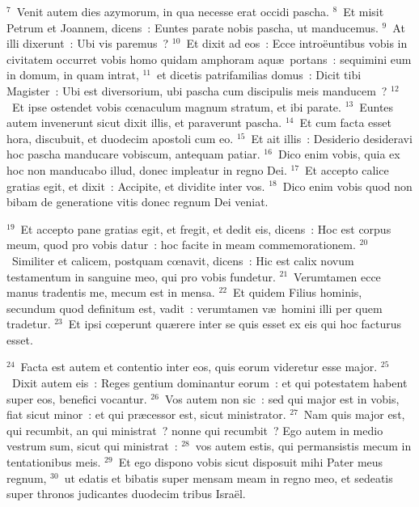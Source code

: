 ${}^{7}$~Venit autem dies azymorum, in qua necesse erat occidi pascha.
${}^{8}$~Et misit Petrum et Joannem, dicens~: Euntes parate nobis pascha, ut manducemus.
${}^{9}$~At illi dixerunt~: Ubi vis paremus~?
${}^{10}$~Et dixit ad eos~: Ecce intro\"euntibus vobis in civitatem occurret vobis homo quidam amphoram aqu\ae\ portans~: sequimini eum in domum, in quam intrat,
${}^{11}$~et dicetis patrifamilias domus~: Dicit tibi Magister~: Ubi est diversorium, ubi pascha cum discipulis meis manducem~?
${}^{12}$~Et ipse ostendet vobis cœnaculum magnum stratum, et ibi parate.
${}^{13}$~Euntes autem invenerunt sicut dixit illis, et paraverunt pascha.
${}^{14}$~Et cum facta esset hora, discubuit, et duodecim apostoli cum eo.
${}^{15}$~Et ait illis~: Desiderio desideravi hoc pascha manducare vobiscum, antequam patiar.
${}^{16}$~Dico enim vobis, quia ex hoc non manducabo illud, donec impleatur in regno Dei.
${}^{17}$~Et accepto calice gratias egit, et dixit~: Accipite, et dividite inter vos.
${}^{18}$~Dico enim vobis quod non bibam de generatione vitis donec regnum Dei veniat.


${}^{19}$~Et accepto pane gratias egit, et fregit, et dedit eis, dicens~: Hoc est corpus meum, quod pro vobis datur~: hoc facite in meam commemorationem.
${}^{20}$~Similiter et calicem, postquam cœnavit, dicens~: Hic est calix novum testamentum in sanguine meo, qui pro vobis fundetur.
${}^{21}$~Verumtamen ecce manus tradentis me, mecum est in mensa.
${}^{22}$~Et quidem Filius hominis, secundum quod definitum est, vadit~: verumtamen v\ae\ homini illi per quem tradetur.
${}^{23}$~Et ipsi cœperunt qu\ae rere inter se quis esset ex eis qui hoc facturus esset.


${}^{24}$~Facta est autem et contentio inter eos, quis eorum videretur esse major.
${}^{25}$~Dixit autem eis~: Reges gentium dominantur eorum~: et qui potestatem habent super eos, benefici vocantur.
${}^{26}$~Vos autem non sic~: sed qui major est in vobis, fiat sicut minor~: et qui pr\ae cessor est, sicut ministrator.
${}^{27}$~Nam quis major est, qui recumbit, an qui ministrat~? nonne qui recumbit~? Ego autem in medio vestrum sum, sicut qui ministrat~:
${}^{28}$~vos autem estis, qui permansistis mecum in tentationibus meis.
${}^{29}$~Et ego dispono vobis sicut disposuit mihi Pater meus regnum,
${}^{30}$~ut edatis et bibatis super mensam meam in regno meo, et sedeatis super thronos judicantes duodecim tribus Isra\"el.


